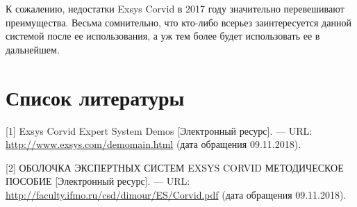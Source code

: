 \documentclass[14pt,a4paper,report]{report}
\begin{document}
К сожалению, недостатки Exsys Corvid в 2017 году значительно перевешивают преимущества. Весьма сомнительно, что кто-либо всерьез заинтересуется данной системой после ее использования, а уж тем более будет использовать ее в дальнейшем.

\section{Список литературы}


\begin{flushleft}
	
[1] Exsys Corvid Expert System Demos [Электронный ресурс]. — URL: \href{http://www.exsys.com/demomain.html}{http://www.exsys.com/demomain.html} (дата обращения 09.11.2018). \linebreak

[2] ОБОЛОЧКА ЭКСПЕРТНЫХ СИСТЕМ EXSYS CORVID МЕТОДИЧЕСКОЕ ПОСОБИЕ [Электронный ресурс]. — URL: \href{http://faculty.ifmo.ru/csd/dimour/ES/Corvid.pdf}{http://faculty.ifmo.ru/csd/dimour/ES/Corvid.pdf} (дата обращения 09.11.2018). \linebreak

\end{flushleft}
	
\end{document}
